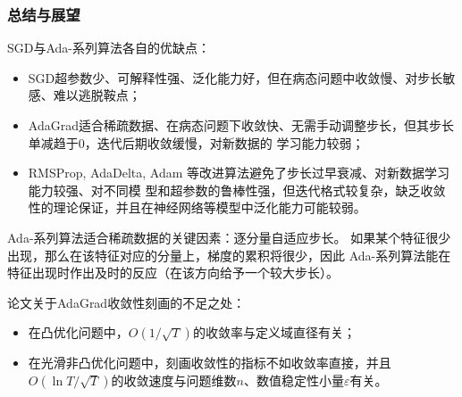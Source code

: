 \documentclass[9pt,aspectratio=169]{beamer}
\begin{document}
\begin{frame}
	\frametitle{总结与展望}
SGD与Ada-系列算法各自的优缺点：
\begin{itemize}
	\item SGD超参数少、可解释性强、泛化能力好，但在病态问题中收敛慢、对步长敏感、难以逃脱鞍点；
	\item AdaGrad适合稀疏数据、在病态问题下收敛快、无需手动调整步长，但其步长单减趋于0，迭代后期收敛缓慢，对新数据的
	学习能力较弱；
	\item RMSProp, AdaDelta, Adam 等改进算法避免了步长过早衰减、对新数据学习能力较强、对不同模
	型和超参数的鲁棒性强，但迭代格式较复杂，缺乏收敛性的理论保证，并且在神经网络等模型中泛化能力可能较弱。
\end{itemize}
\vspace{0.3cm}
Ada-系列算法适合稀疏数据的关键因素：逐分量自适应步长。
如果某个特征很少出现，那么在该特征对应的分量上，梯度的累积将很少，因此 Ada-系列算法能在
特征出现时作出及时的反应（在该方向给予一个较大步长）。


\vspace{0.3cm}
论文关于AdaGrad收敛性刻画的不足之处：
\begin{itemize}
	\item 在凸优化问题中，$O(1/\sqrt{T})$的收敛率与定义域直径有关；
	\item 在光滑非凸优化问题中，刻画收敛性的指标不如收敛率直接，并且$O(\ln T/\sqrt{T})$的收敛速度与问题维数$n$、数值稳定性小量$\varepsilon$有关。
\end{itemize}
	

\end{frame}
\end{document}
